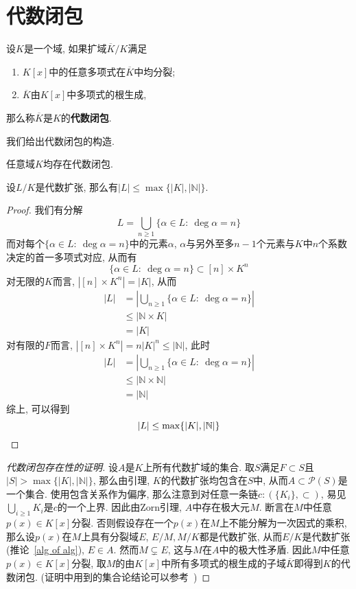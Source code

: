 \section{代数闭包}
\begin{defn}
    设$K$是一个域, 如果扩域$\overline{K}/K$满足
    \begin{enumerate}[(1)]
        \item $K[x]$中的任意多项式在$\overline{K}$中均分裂;
        \item $\overline{K}$由$K[x]$中多项式的根生成,
    \end{enumerate}
    那么称$\overline{K}$是$K$的\textbf{代数闭包}.
\end{defn}

我们给出代数闭包的构造.
\begin{thm}
    任意域$K$均存在代数闭包.
\end{thm}
\begin{lem}
    设$L/K$是代数扩张, 那么有$|L|\leq\max\{|K|,|\mathbb{N}|\}$.
\end{lem}
\begin{proof}
    我们有分解
    \[L=\bigcup_{n\geq 1}\{\alpha\in L:\ \deg\alpha=n\}\]
    而对每个$\{\alpha\in L:\ \deg\alpha=n\}$中的元素$\alpha$, $\alpha$与另外至多$n-1$个元素与$K$中$n$个系数决定的首一多项式对应, 从而有
    \[\{\alpha\in L:\ \deg\alpha=n\}\subset [n]\times K^n\]
    对无限的$K$而言, $|[n]\times K^n|=|K|$, 从而
    \begin{align*}
        |L|&=\left|\bigcup_{n\geq 1}\{\alpha\in L:\ \deg\alpha=n\}\right|\\
        &\leq|\mathbb{N}\times K|\\
        &=|K|
    \end{align*}
    对有限的$F$而言, $|[n]\times K^n|=n|K|^n\leq|\mathbb{N}|$, 此时
    \begin{align*}
        |L|&=\left|\bigcup_{n\geq 1}\{\alpha\in L:\ \deg\alpha=n\}\right|\\
        &\leq|\mathbb{N}\times\mathbb{N}|\\
        &=|\mathbb{N}|
    \end{align*}
    综上, 可以得到
    \[|L|\leq\max\{|K|,|\mathbb{N}|\}\qedhere\]
\end{proof}
\begin{proof}[代数闭包存在性的证明]
    设$A$是$K$上所有代数扩域的集合.
    取$S$满足$F\subset S$且$|S|>\max\{|K|,|\mathbb{N}|\}$, 那么由引理, $K$的代数扩张均包含在$S$中, 从而$A\subset\mathcal{P}(S)$是一个集合.
    使用包含关系作为偏序, 那么注意到对任意一条链$c:(\{K_i\},\subset)$, 易见$\bigcup_{i\geq 1}K_i$是$c$的一个上界.
    因此由Zorn引理, $A$中存在极大元$M$.
    断言在$M$中任意$p(x)\in K[x]$分裂.
    否则假设存在一个$p(x)$在$M$上不能分解为一次因式的乘积, 那么设$p(x)$在$M$上具有分裂域$E$, $E/M,M/K$都是代数扩张, 从而$E/K$是代数扩张 (推论~\ref{alg of alg}), $E\in A$.
    然而$M\subsetneq E$, 这与$M$在$A$中的极大性矛盾.
    因此$M$中任意$p(x)\in K[x]$分裂, 取$M$的由$K[x]$中所有多项式的根生成的子域$\overline{K}$即得到$K$的代数闭包.
    (证明中用到的集合论结论可以参考~\parencite[附录2第2, 3节]{Lang})
\end{proof}

